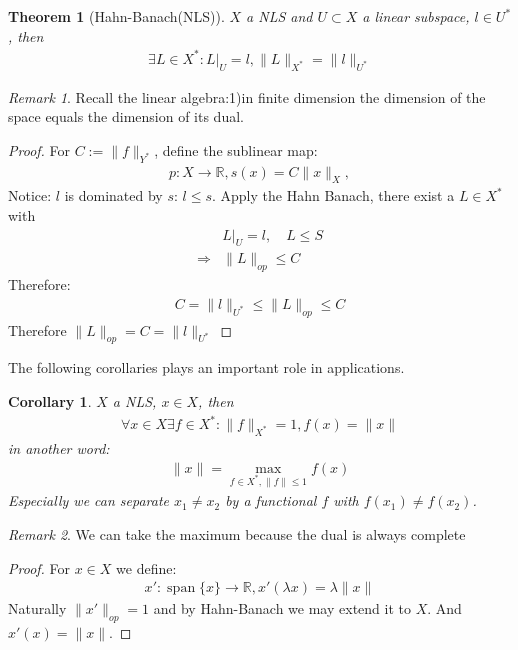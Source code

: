 \documentclass[a4paper,11pt,fleqn]{book}
\newtheorem{theorem}{Theorem}[section]
\newtheorem{corollary}{Corollary}[theorem]
\theoremstyle{definition}
\theoremstyle{remark}
\newtheorem*{remark}{Remark}
\DeclareMathOperator*{\spa}{span}
\begin{document}
\begin{theorem}[Hahn-Banach(NLS)]
	$X$ a NLS and $U\subset X$ a linear subspace, $l \in U^*$ , then 
	\begin{align*}
		\exists L \in X^*: L|_U = l, \|L\|_{X^*} = \|l\|_{U^*}
	\end{align*}
\end{theorem}
\begin{remark}
	Recall the linear algebra:1)in finite dimension the dimension of the space equals the dimension of its dual. 
\end{remark}
\begin{proof}
	For $C:= \|f\|_{Y^*}$, define the sublinear map:
	\begin{align*}
		p: X \rightarrow \mathbb{R},   s(x) = C\|x\|_X, 
	\end{align*}
	Notice: $l$ is dominated by $s$: $l\leq s$. Apply the Hahn Banach, there exist a $L \in X^*$ with
	\begin{align*}
					&L|_U = l, \quad L \leq S\\
		\Rightarrow &\|L\|_{op} \leq C 
	\end{align*}
	Therefore:
	\begin{align*}
		C = \|l\|_{U^*} \leq \|L\|_{op} \leq C
	\end{align*}
	Therefore $\|L\|_{op} = C = \|l\|_{U^*}$
\end{proof}

The following corollaries plays an important role in applications.
\begin{corollary}
	$X$ a NLS, $x \in X$, then 
	\begin{align*}
		\forall x \in X\exists f \in X^*: \|f\|_{X^*} = 1, f(x) = \|x\|
	\end{align*}
	in another word:
	\begin{align*}
		\|x\| = \max_{f \in X^*, \|f\| \leq 1} f(x) 
	\end{align*}
	Especially we can separate $x_1 \neq x_2$ by a functional $f$ with $f(x_1) \neq f(x_2)$. 
\end{corollary}
\begin{remark}
We can take the maximum because the dual is always complete 
\end{remark}
\begin{proof}
	For $x \in X$ we define:
	\begin{align*}
		x': \spa\{x\} \rightarrow \mathbb{R}, x'(\lambda x) = \lambda\|x\|
	\end{align*}
	Naturally $\|x'\|_{op} = 1$ and by Hahn-Banach we may extend it to $X$. And $x'(x) = \|x\|$.
\end{proof}
\end{document}
